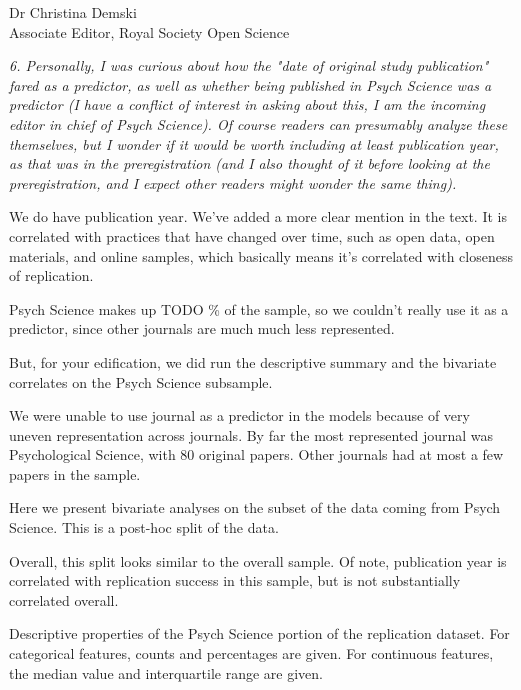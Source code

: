 \documentclass{stanfordletter}
\newcommand{\theysaid}[1]{\begin{leftbar} \noindent 
		\textsl{ #1}\end{leftbar}}
\begin{document}
\begin{letter}{Dr Christina Demski \\ Associate Editor, Royal Society Open Science}
          \theysaid{
          	6. Personally, I was curious about how the "date of original study publication" fared as a predictor, as well as whether being published in Psych Science was a predictor (I have a conflict of interest in asking about this, I am the incoming editor in chief of Psych Science).  Of course readers can presumably analyze these themselves, but I wonder if it would be worth including at least publication year, as that was in the preregistration (and I also thought of it before looking at the preregistration, and I expect other readers might wonder the same thing).
          }
          We do have publication year. We've added a more clear mention in the text. It is correlated with practices that have changed over time, such as open data, open materials, and online samples, which basically means it's correlated with closeness of replication. 
          
          Psych Science makes up TODO \% of the sample, so we couldn't really use it as a predictor, since other journals are much much less represented. 
          
          But, for your edification, we did run the descriptive summary and the bivariate correlates on the Psych Science subsample. 
         
          
          We were unable to use journal as a predictor in the models because of very uneven representation across journals. By far the most represented journal was Psychological Science, with 80 original papers. Other journals had at most a few papers in the sample.
          
          Here we present bivariate analyses on the subset of the data coming from Psych Science. This is a post-hoc split of the data.
          
          Overall, this split looks similar to the overall sample. Of note, publication year is correlated with replication success in this sample, but is not substantially correlated overall.
          
\begin{center}
          
          Descriptive properties of the Psych Science portion of the replication dataset. For categorical features, counts and percentages are given. For continuous features, the median value and interquartile range are given. 


\end{center}
\end{letter}
\end{document}
